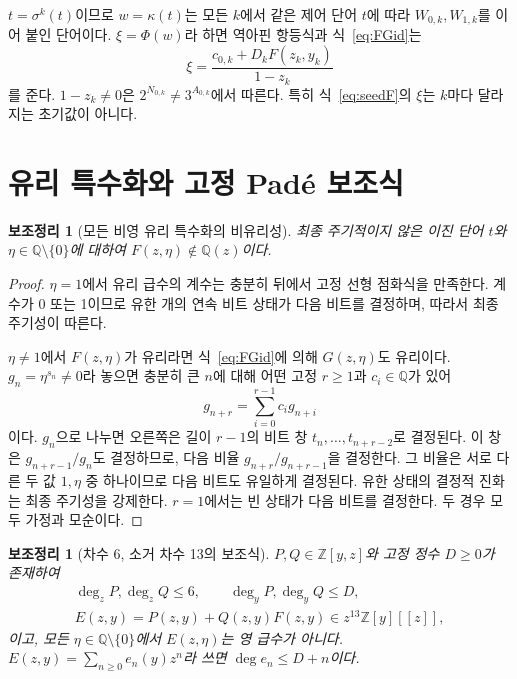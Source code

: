 \documentclass[11pt,a4paper]{article}
\theoremstyle{koreanplain}
\newtheorem{lemma}[theorem]{보조정리}
\newcommand{\Q}{\mathbb Q}
\newcommand{\Z}{\mathbb Z}
\begin{document}
$t=\sigma^k(t)$이므로 $w=\kappa(t)$는 모든 $k$에서 같은 제어 단어 $t$에 따라 $W_{0,k},W_{1,k}$를 이어 붙인 단어이다. $\xi=\Phi(w)$라 하면 역아핀 항등식과 식~\eqref{eq:FGid}는
\begin{equation}\label{eq:seedF}
\xi=\frac{c_{0,k}+D_kF(z_k,y_k)}{1-z_k}
\end{equation}
를 준다. $1-z_k\ne0$은 $2^{N_{0,k}}\ne3^{A_{0,k}}$에서 따른다. 특히 식~\eqref{eq:seedF}의 $\xi$는 $k$마다 달라지는 초기값이 아니다.

\section{유리 특수화와 고정 Padé 보조식}

\begin{lemma}[모든 비영 유리 특수화의 비유리성]\label{lem:NS}
최종 주기적이지 않은 이진 단어 $t$와 $\eta\in\Q\setminus\{0\}$에 대하여 $F(z,\eta)\notin\Q(z)$이다.
\end{lemma}

\begin{proof}
$\eta=1$에서 유리 급수의 계수는 충분히 뒤에서 고정 선형 점화식을 만족한다. 계수가 0 또는 1이므로 유한 개의 연속 비트 상태가 다음 비트를 결정하며, 따라서 최종 주기성이 따른다.

$\eta\ne1$에서 $F(z,\eta)$가 유리라면 식~\eqref{eq:FGid}에 의해 $G(z,\eta)$도 유리이다. $g_n=\eta^{s_n}\ne0$라 놓으면 충분히 큰 $n$에 대해 어떤 고정 $r\ge1$과 $c_i\in\Q$가 있어
\[
g_{n+r}=\sum_{i=0}^{r-1}c_i g_{n+i}
\]
이다. $g_n$으로 나누면 오른쪽은 길이 $r-1$의 비트 창 $t_n,\ldots,t_{n+r-2}$로 결정된다. 이 창은 $g_{n+r-1}/g_n$도 결정하므로, 다음 비율 $g_{n+r}/g_{n+r-1}$을 결정한다. 그 비율은 서로 다른 두 값 $1,\eta$ 중 하나이므로 다음 비트도 유일하게 결정된다. 유한 상태의 결정적 진화는 최종 주기성을 강제한다. $r=1$에서는 빈 상태가 다음 비트를 결정한다. 두 경우 모두 가정과 모순이다.
\end{proof}

\begin{lemma}[차수 6, 소거 차수 13의 보조식]\label{lem:Pade}
$P,Q\in\Z[y,z]$와 고정 정수 $D\ge0$가 존재하여
\begin{equation}\label{eq:pade}
\begin{gathered}
\deg_zP,\deg_zQ\le6,\qquad \deg_yP,\deg_yQ\le D,\\
E(z,y)=P(z,y)+Q(z,y)F(z,y)\in z^{13}\Z[y][[z]],
\end{gathered}
\end{equation}
이고, 모든 $\eta\in\Q\setminus\{0\}$에서 $E(z,\eta)$는 영 급수가 아니다. $E(z,y)=\sum_{n\ge0}e_n(y)z^n$라 쓰면 $\deg e_n\le D+n$이다.
\end{lemma}
\end{document}
